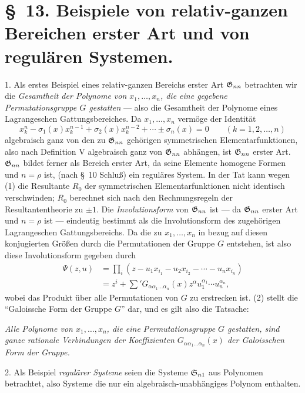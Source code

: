\section*{\S\ 13. Beispiele von relativ-ganzen Bereichen erster Art und von regulären Systemen.}

1. Als erstes Beispiel eines relativ-ganzen Bereichs erster Art $\mathfrak{G}_{nn}$ betrachten wir die \emph{Gesamtheit der Polynome von $x_1,
\ldots,x_n$, die eine gegebene Permutationsgruppe $G$ gestatten} --- also die Gesamtheit der Polynome eines Lagrangeschen Gattungsbereiches. Da $x_1,
\ldots,x_n$ vermöge der Identität
\begin{equation}
  x_k^n-\sigma_1(x)x_k^{n-1}+\sigma_2(x)x_k^{n-2}+\cdots\pm\sigma_n(x)=0
  \qquad(k=1,2,
\ldots,n)
\tag{1}
\end{equation}
algebraisch ganz von den zu $\mathfrak{G}_{nn}$ gehörigen symmetrischen Elementarfunktionen, also nach Definition V algebraisch ganz von $\mathfrak{G}_{nn}$ abhängen, ist $\mathfrak{G}_{nn}$ erster Art. $\mathfrak{G}_{nn}$ bildet ferner als Bereich erster Art, da seine Elemente homogene Formen und $n=\rho$ ist, (nach \S\ 10 Schluß) ein reguläres System. In der Tat kann wegen (1) die Resultante $R_0$ der symmetrischen Elementarfunktionen nicht identisch verschwinden; $R_0$ berechnet sich nach den Rechnungsregeln der Resultantentheorie zu $\pm1$. Die \emph{Involutionsform} von $\mathfrak{G}_{nn}$ ist --- da $\mathfrak{G}_{nn}$ erster Art und $n=\rho$ ist --- eindeutig bestimmt als die Involutionsform des zugehörigen Lagrangeschen Gattungsbereichs. Da die zu $x_1,
\ldots,x_n$ in bezug auf diesen konjugierten Größen durch die Permutationen der Gruppe $G$ entstehen, ist also diese Involutionsform gegeben durch
\begin{equation}
\begin{aligned}
  \Psi(z,u)&=\prod_i
  (z-u_1x_{i_1}-u_2x_{i_2}-\cdots-u_nx_{i_n})\\
  &=z^i+\sum{}'G_{\alpha\alpha_1\ldots\alpha_n}(x)
  z^\alpha u_1^{\alpha_1}\cdots u_n^{\alpha_n},
\end{aligned}
\tag{2}
\end{equation}
wobei das Produkt über alle Permutationen von $G$ zu erstrecken ist. (2) stellt die ``Galoissche Form der Gruppe $G$'' dar, und es gilt also die Tatsache:

\emph{Alle Polynome von $x_1,
\ldots,x_n$, die eine Permutationsgruppe $G$ gestatten, sind ganze rationale Verbindungen der Koeffizienten $G_{\alpha\alpha_1\ldots\alpha_n}(x)$ der Galoisschen Form der Gruppe.}

2. Als Beispiel \emph{regulärer Systeme} seien die Systeme $\mathfrak{S}_{n1}$ aus Polynomen betrachtet, also Systeme die nur ein algebraisch-unabhängiges Polynom enthalten.

